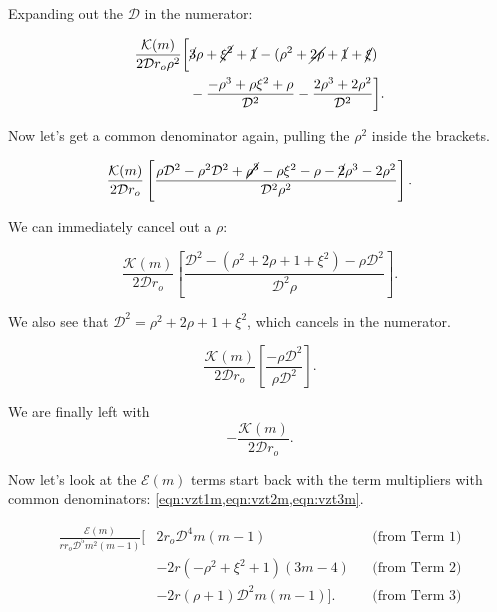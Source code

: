 \noindent Expanding out the \(\mathcal{D}\) in the numerator:

\begin{equation}
    \begin{aligned}
        \frac{\mathcal{K}(m)}{2\mathcal{D}r_o \rho^2 } \bigg[&   \cancel{3}\rho+\cancel{\xi^2} +\cancel{1} -(\rho^2 +\cancel{2\rho} +\cancel{1} +\cancel{\xi})  \\
        &- \frac{-\rho^3+\rho\xi^2+\rho}{\mathcal{D}^2} - \frac{2\rho^3 +2\rho^2}{\mathcal{D}^2} \bigg].
    \end{aligned}
\end{equation}

\noindent Now let's get a common denominator again, pulling the \(\rho^2\) inside the brackets.

\begin{equation}
    \frac{\mathcal{K}(m)}{2\mathcal{D}r_o } \left[\frac{\rho\mathcal{D}^2 -\rho^2\mathcal{D}^2 + \cancel{\rho^3}-\rho\xi^2-\rho - \cancel{2}\rho^3 -2\rho^2}{\mathcal{D}^2\rho^2} \right].
\end{equation}

\noindent We can immediately cancel out a \(\rho\):

\begin{equation}
    \frac{\mathcal{K}(m)}{2\mathcal{D}r_o } \left[ \frac{\mathcal{D}^2 -(\rho^2 +2\rho +1 +\xi^2)-\rho\mathcal{D}^2}{\mathcal{D}^2\rho} \right].
\end{equation}

\noindent We also see that \(\mathcal{D}^2 = \rho^2 + 2\rho +1 +\xi^2\), which cancels in the numerator.

\begin{equation}
    \frac{\mathcal{K}(m)}{2\mathcal{D}r_o } \left[\frac{-\rho\mathcal{D}^2}{\rho\mathcal{D}^2} \right].
\end{equation}

\noindent We are finally left with
\begin{equation}
    \label{eqn:vzksimple}
    -\frac{\mathcal{K}(m)}{2\mathcal{D}r_o }.
\end{equation}

Now let's look at the \(\mathcal{E}(m)\) terms start back with the term multipliers with common denominators: \cref{eqn:vzt1m,eqn:vzt2m,eqn:vzt3m}.


\begin{equation}
    \begin{aligned}
        \frac{\mathcal{E}(m)}{rr_o\mathcal{D}^5m^2(m-1)} \bigg[&  2r_o\mathcal{D}^4m(m-1)  && \text{(from Term 1)} \\
      &- 2r(-\rho^2+\xi^2+1)(3m-4) && \text{(from Term 2)} \\
      &- 2r(\rho+1)\mathcal{D}^2m(m-1) \bigg]. && \text{(from Term 3)}
    \end{aligned}
\end{equation}

